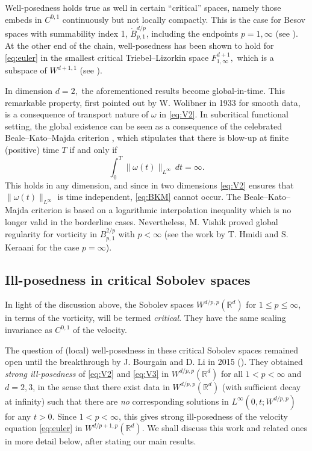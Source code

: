 \documentclass[11pt]{amsart}
\newcommand{\R}{{\mathbb R}}
\numberwithin{equation}{section}
\newcommand{\omg}{\omega}
\def\bbR{\mathbb{R}}
\begin{document}
Well-posedness holds true as well in certain ``critical'' spaces, namely those embeds in $C^{0,1}$ continuously but not locally compactly. This is the case for Besov spaces with summability index 1, $\dot B^{d/p}_{p,1}$, including the endpoints $p=1, \infty$ (see \cite{PP,PP2}). 
    At the other end of the chain,  well-posedness has been shown to hold  for \eqref{eq:euler} 
    in  the smallest critical Triebel--Lizorkin space 
    $F^{d+1}_{1,\infty},$ which is a subspace of $W^{d+1,1}$ (see \cite{HP}).


   In dimension $d=2,$   the aforementioned results become global-in-time. This remarkable property, first pointed out
   by W. Wolibner  \cite{W} in 1933 for smooth data, 
   is a consequence of transport nature of $\omg$ in \eqref{eq:V2}.   In subcritical functional setting, the global existence can be seen as a consequence of the celebrated Beale--Kato--Majda criterion \cite{BKM}, which stipulates that there is blow-up at finite (positive) time $T$ if and only if 
\begin{equation}\label{eq:BKM} \int_0^T\| \omega (t) \|_{L^\infty}\,dt=\infty.\end{equation}
This holds in any dimension, and since in two dimensions \eqref{eq:V2} ensures that $\|\omega(t)\|_{L^\infty}$ is time independent, \eqref{eq:BKM} cannot occur. The  Beale--Kato--Majda criterion is based on a logarithmic interpolation inequality which is no longer valid in the borderline cases. Nevertheless,  M. Vishik proved global regularity for vorticity in $B^{2/p}_{p,1}$ with $p<\infty$ \cite{Vishik} (see the work \cite{HK} by T. Hmidi and S. Keraani for the case $p=\infty$).  
    
\subsection{Ill-posedness in critical Sobolev spaces} In light of the discussion above, the Sobolev spaces $W^{d/p,p}(\R^d)$ for $1 \le p \le \infty$, in terms of the vorticity, will be termed \textit{critical}. They have the same scaling invariance as $C^{0,1}$ of the velocity. 

The question of (local) well-posedness in these critical Sobolev spaces remained open until the breakthrough by J. Bourgain and D. Li in 2015 (\cite{BL1,BL3}). They obtained \textit{strong ill-posedness} of \eqref{eq:V2} and \eqref{eq:V3} in $W^{d/p,p}(\bbR^d)$ for all $1 < p < \infty$ and $d = 2, 3$, in the sense that there exist data in $W^{d/p,p}(\bbR^d)$ (with sufficient decay at infinity) such that there are \textit{no} corresponding solutions in $L^{\infty}(0,t;W^{d/p,p})$ for any $t>0$. Since $1 < p < \infty$, this gives strong ill-posedness of the velocity equation \eqref{eq:euler} in $W^{d/p +1 ,p}(\R^d)$. We shall discuss this work and related ones in more detail below, after stating our main results. 
\end{document}
